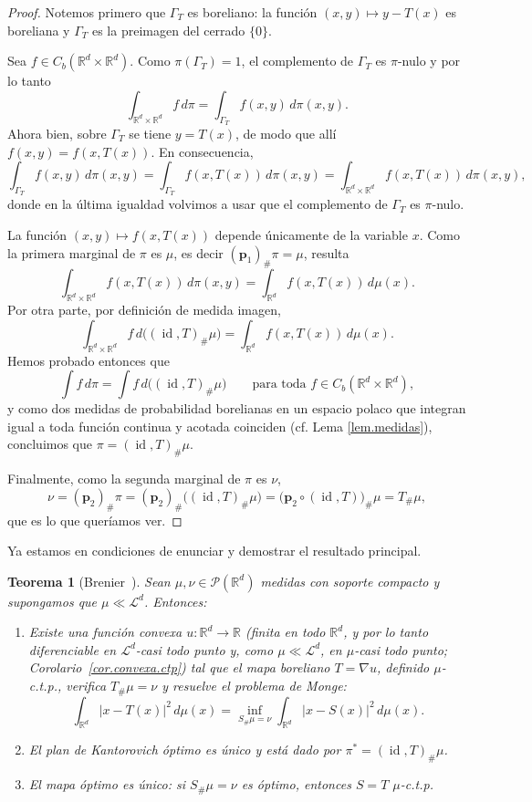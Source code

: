 \documentclass[12pt, a4paper]{amsbook}
\newcommand{\id}{\operatorname{id}}
\newcommand{\R}{{\mathbb R}}
\newcommand{\pp}{{\mathbf p}}
\newtheorem{teo}{Teorema}[section]
\theoremstyle{remark}
\theoremstyle{definition}
\numberwithin{section}{chapter}
\numberwithin{subsection}{section}
\numberwithin{equation}{section}
\numberwithin{figure}{chapter}
\begin{document}
\begin{proof}
Notemos primero que $\Gamma_T$ es boreliano: la función
$(x,y)\mapsto y-T(x)$ es boreliana y $\Gamma_T$ es la preimagen del cerrado
$\{0\}$.

Sea $f\in C_b(\R^d\times\R^d)$. Como $\pi(\Gamma_T)=1$, el complemento de
$\Gamma_T$ es $\pi$-nulo y por lo tanto
\[
\int_{\R^d\times\R^d}f\,d\pi
=
\int_{\Gamma_T}f(x,y)\,d\pi(x,y).
\]
Ahora bien, sobre $\Gamma_T$ se tiene $y=T(x)$, de modo que allí
$f(x,y)=f(x,T(x))$. En consecuencia,
\[
\int_{\Gamma_T}f(x,y)\,d\pi(x,y)
=
\int_{\Gamma_T}f(x,T(x))\,d\pi(x,y)
=
\int_{\R^d\times\R^d}f(x,T(x))\,d\pi(x,y),
\]
donde en la última igualdad volvimos a usar que el complemento de $\Gamma_T$
es $\pi$-nulo.

La función $(x,y)\mapsto f(x,T(x))$ depende únicamente de la variable $x$.
Como la primera marginal de $\pi$ es $\mu$, es decir $(\pp_1)_\#\pi=\mu$,
resulta
\[
\int_{\R^d\times\R^d}f(x,T(x))\,d\pi(x,y)
=
\int_{\R^d}f(x,T(x))\,d\mu(x).
\]
Por otra parte, por definición de medida imagen,
\[
\int_{\R^d\times\R^d}f\,d\bigl((\id,T)_\#\mu\bigr)
=
\int_{\R^d}f(x,T(x))\,d\mu(x).
\]
Hemos probado entonces que
\[
\int f\,d\pi
=
\int f\,d\bigl((\id,T)_\#\mu\bigr)
\qquad
\text{para toda }f\in C_b(\R^d\times\R^d),
\]
y como dos medidas de probabilidad borelianas en un espacio polaco que
integran igual a toda función continua y acotada coinciden (cf. Lema \ref{lem.medidas}), concluimos que
$\pi=(\id,T)_\#\mu$.

Finalmente, como la segunda marginal de $\pi$ es $\nu$,
\[
\nu
=
(\pp_2)_\#\pi
=
(\pp_2)_\#\bigl((\id,T)_\#\mu\bigr)
=
\bigl(\pp_2\circ(\id,T)\bigr)_\#\mu
=
T_\#\mu,
\]
que es lo que queríamos ver.
\end{proof}

Ya estamos en condiciones de enunciar y demostrar el resultado principal.

\begin{teo}[Brenier~\cite{Brenier1987,Brenier1991}]\label{teo.Brenier}
Sean $\mu,\nu\in\mathcal P(\R^d)$ medidas con soporte compacto y supongamos
que $\mu\ll\mathcal L^d$. Entonces:
\begin{enumerate}
\item Existe una función convexa $u\colon\R^d\to\R$ (finita en todo $\R^d$,
y por lo tanto diferenciable en $\mathcal L^d$-casi todo punto y, como
$\mu\ll\mathcal L^d$, en $\mu$-casi todo punto; Corolario~\ref{cor.convexa.ctp})
tal que el mapa boreliano
$T=\nabla u$, definido $\mu$-c.t.p., verifica $T_\#\mu=\nu$ y resuelve el
problema de Monge:
\[
\int_{\R^d}|x-T(x)|^2\,d\mu(x)
=
\inf_{S_\#\mu=\nu}\int_{\R^d}|x-S(x)|^2\,d\mu(x).
\]
\item El plan de Kantorovich óptimo es único y está dado por
$\pi^*=(\id,T)_\#\mu$.
\item El mapa óptimo es único: si $S_\#\mu=\nu$ es óptimo, entonces
$S=T$ $\mu$-c.t.p.
\end{enumerate}
\end{teo}
\end{document}
